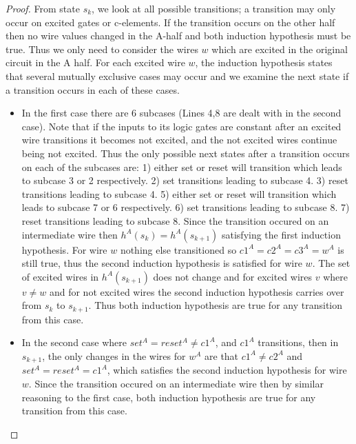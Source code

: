 \documentclass{article}
\begin{document}
\begin{proof}
From state $s_k$, we look at all possible transitions; a transition may only occur on excited gates or c-elements.  If the transition occurs on the other half then no wire values changed in the A-half and both induction hypothesis must be true.  Thus we only need to consider the wires $w$ which are excited in the original circuit in the A half.  For each excited wire $w$, the induction hypothesis states that several mutually exclusive cases may occur and we examine the next state if a transition occurs in each of these cases.
\begin{itemize}
\item In the first case there are 6 subcases (Lines 4,8 are dealt with in the second case).  Note that if the inputs to its logic gates are constant after an excited wire transitions it becomes not excited, and the not excited wires continue being not excited.  Thus the only possible next states after a transition occurs on each of the subcases are: 1) either set or reset will transition which leads to subcase 3 or 2 respectively.  2) set transitions leading to subcase 4. 3) reset transitions leading to subcase 4.  5) either set or reset will transition which leads to subcase 7 or 6 respectively.  6) set transitions leading to subcase 8. 7) reset transitions leading to subcase 8.  Since the transition occured on an intermediate wire then $h^A(s_k)=h^A(s_{k+1})$ satisfying the first induction hypothesis.  For wire $w$ nothing else transitioned so $c1^A=c2^A=c3^A=w^A$ is still true, thus the second induction hypothesis is satisfied for wire $w$.   The set of excited wires in $h^A(s_{k+1})$ does not change and for excited wires $v$ where $v\neq w$ and for not excited wires the second induction hypothesis carries over from $s_k$ to $s_{k+1}$.  Thus both induction hypothesis are true for any transition from this case. 
\item
In the second case where $set^A=reset^A \neq c1^A$, and $c1^A$ transitions, then in $s_{k+1}$, the only changes in the wires for $w^A$ are that $c1^A\neq c2^A$ and $set^A=reset^A = c1^A$, which satisfies the second induction hypothesis for wire $w$.  Since the transition occured on an intermediate wire then by similar reasoning to the first case, both induction hypothesis are true for any transition from this case. %

\end{itemize}
\end{proof}
\end{document}
